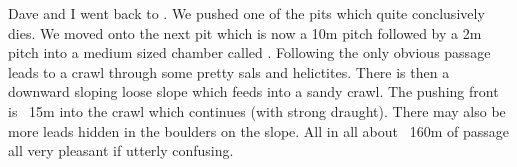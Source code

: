 Dave and I went back to . We pushed one of the pits which quite conclusively dies. We moved onto the next pit which is now a 10m pitch followed by a 2m pitch into a medium sized chamber called . Following the only obvious passage leads to  a crawl through some pretty sals and helictites. There is then a downward sloping loose slope which feeds into a sandy crawl. The pushing front is ~15m into the crawl which continues (with strong draught). There may also be more leads hidden in the boulders on the slope. All in all about ~160m of passage all very pleasant if utterly confusing. 


\clearpage


